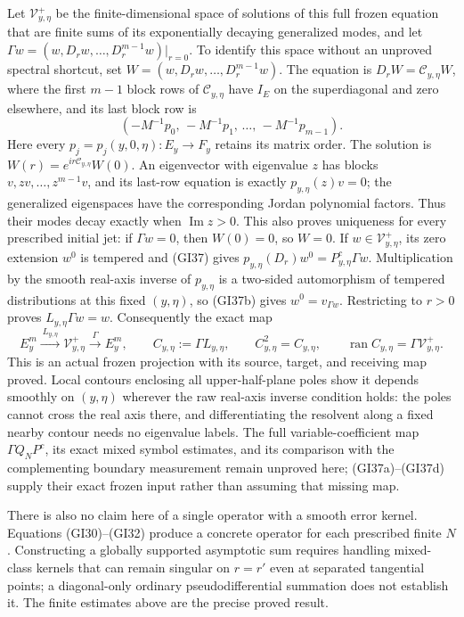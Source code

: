 \documentclass[
  11pt,
]{article}
\begin{document}
Let \(\mathcal V^+_{y,\eta}\) be the finite-dimensional space of
solutions of this full frozen equation that are finite sums of its
exponentially decaying generalized modes, and let
\(\Gamma w=(w,D_rw,\ldots,D_r^{m-1}w)|_{r=0}\). To identify this space
without an unproved spectral shortcut, set
\(W=(w,D_rw,\ldots,D_r^{m-1}w)\). The equation is
\(D_rW=\mathcal C_{y,\eta}W\), where the first \(m-1\) block rows of
\(\mathcal C_{y,\eta}\) have \(I_E\) on the superdiagonal and zero
elsewhere, and its last block row is \[
 (-M^{-1}p_0,\,-M^{-1}p_1,\,\ldots,\,-M^{-1}p_{m-1}).
 \tag{GI37e}
\] Here every \(p_j=p_j(y,0,\eta):E_y\to F_y\) retains its matrix order.
The solution is \(W(r)=e^{ir\mathcal C_{y,\eta}}W(0)\). An eigenvector
with eigenvalue \(z\) has blocks \(v,zv,\ldots,z^{m-1}v\), and its
last-row equation is exactly \(p_{y,\eta}(z)v=0\); the generalized
eigenspaces have the corresponding Jordan polynomial factors. Thus their
modes decay exactly when \(\operatorname{Im}z>0\). This also proves
uniqueness for every prescribed initial jet: if \(\Gamma w=0\), then
\(W(0)=0\), so \(W=0\). If \(w\in\mathcal V^+_{y,\eta}\), its zero
extension \(w^0\) is tempered and (GI37) gives
\(p_{y,\eta}(D_r)w^0=P^c_{y,\eta}\Gamma w\). Multiplication by the
smooth real-axis inverse of \(p_{y,\eta}\) is a two-sided automorphism
of tempered distributions at this fixed \((y,\eta)\), so (GI37b) gives
\(w^0=v_{\Gamma w}\). Restricting to \(r>0\) proves
\(L_{y,\eta}\Gamma w=w\). Consequently the exact map \[
 E_y^m\xrightarrow{\ L_{y,\eta}\ }\mathcal V^+_{y,\eta}
 \xrightarrow{\ \Gamma\ }E_y^m,\qquad
 C_{y,\eta}:=\Gamma L_{y,\eta},\qquad
 C_{y,\eta}^2=C_{y,\eta},\qquad
 \operatorname{ran}C_{y,\eta}=\Gamma\mathcal V^+_{y,\eta}.
 \tag{GI37d}
\] This is an actual frozen projection with its source, target, and
receiving map proved. Local contours enclosing all upper-half-plane
poles show it depends smoothly on \((y,\eta)\) wherever the raw
real-axis inverse condition holds: the poles cannot cross the real axis
there, and differentiating the resolvent along a fixed nearby contour
needs no eigenvalue labels. The full variable-coefficient map
\(\Gamma Q_NP^c\), its exact mixed symbol estimates, and its comparison
with the complementing boundary measurement remain unproved here;
(GI37a)--(GI37d) supply their exact frozen input rather than assuming
that missing map.

There is also no claim here of a single operator with a smooth error
kernel. Equations (GI30)--(GI32) produce a concrete operator for each
prescribed finite \(N\). Constructing a globally supported asymptotic
sum requires handling mixed-class kernels that can remain singular on
\(r=r'\) even at separated tangential points; a diagonal-only ordinary
pseudodifferential summation does not establish it. The finite estimates
above are the precise proved result.
\end{document}
